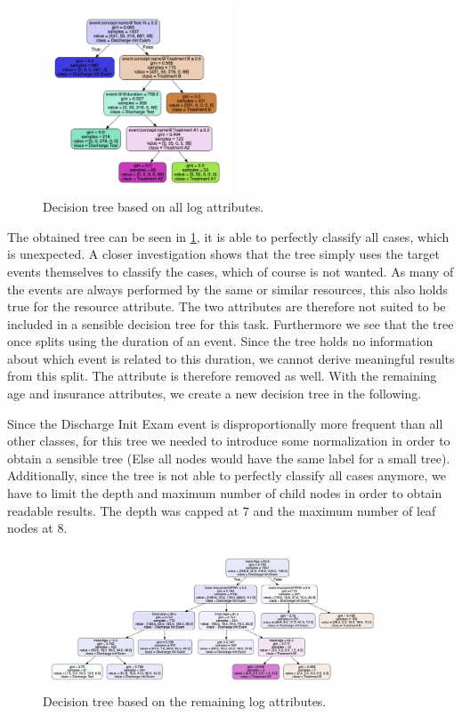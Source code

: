 \documentclass[12pt]{report}
\begin{document}
\begin{figure}[h]
    \centering
    \includegraphics[width=0.5\textwidth]{figures/q4_tree_all.png}
    \caption{Decision tree based on all log attributes.}
    \label{fig:figures-q4-tree-all-png}
\end{figure}

The obtained tree can be seen in \ref{fig:figures-q4-tree-all-png}, it is able to perfectly classify all cases, which is unexpected. A closer investigation shows that the tree simply uses the target events themselves to classify the cases, which of course is not wanted. As many of the events are always performed by the same or similar resources, this also holds true for the resource attribute. The two attributes are therefore not suited to be included in a sensible decision tree for this task.
Furthermore we see that the tree once splits using the duration of an event. Since the tree holds no information about which event is related to this duration, we cannot derive meaningful results from this split. The attribute is therefore removed as well. With the remaining age and insurance attributes, we create a new decision tree in the following.

Since the Discharge Init Exam event is disproportionally more frequent than all other classes, for this tree we needed to introduce some normalization in order to obtain a sensible tree (Else all nodes would have the same label for a small tree). Additionally, since the tree is not able to perfectly classify all cases anymore, we have to limit the depth and maximum number of child nodes in order to obtain readable results. The depth was capped at 7 and the maximum number of leaf nodes at 8.

\begin{figure}[h]
    \centering
    \includegraphics[width=0.9\textwidth]{figures/q4_tree_min.png}
    \caption{Decision tree based on the remaining log attributes.}
    \label{fig:figures-q4-tree-min-png}
\end{figure}
\end{document}
